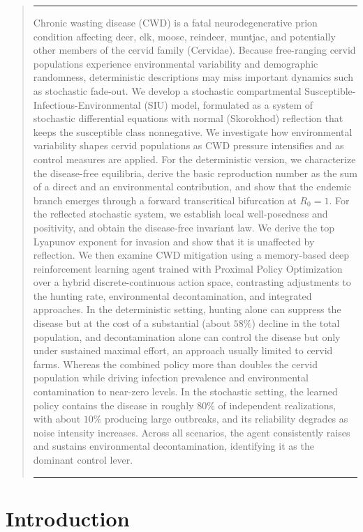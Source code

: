 \documentclass[12pt,a4paper,reqno]{amsart}
\theoremstyle{definition}
\theoremstyle{remark}
\theoremstyle{plain}
\renewenvironment{abstract}
{\begin{quote}
\noindent\rule{\linewidth}{.5pt}\par\vspace*{\dimexpr-1em+7pt\relax}{\scshape\abstractname.}}
{\par\vspace*{-1em}\noindent \rule{\linewidth}{.5pt}\vspace*{1.5em}
\end{quote}
}
\begin{document}
\begin{abstract}
Chronic wasting disease (CWD) is a fatal neurodegenerative prion condition affecting deer, elk, moose, reindeer, muntjac, and potentially other members of the cervid family (Cervidae). Because free-ranging cervid populations experience environmental variability and demographic randomness, deterministic descriptions may miss important dynamics such as stochastic fade-out. We develop a stochastic compartmental Susceptible-Infectious-Environmental (SIU) model, formulated as a system of stochastic differential equations with normal (Skorokhod) reflection that keeps the susceptible class nonnegative. We investigate how environmental variability shapes cervid populations as CWD pressure intensifies and as control measures are applied. For the deterministic version, we characterize the disease-free equilibria, derive the basic reproduction number as the sum of a direct and an environmental contribution, and show that the endemic branch emerges through a forward transcritical bifurcation at $R_0=1$. For the reflected stochastic system, we establish local well-posedness and positivity, and obtain the disease-free invariant law. We derive the top Lyapunov exponent for invasion and show that it is unaffected by reflection. We then examine CWD mitigation using a memory-based deep reinforcement learning agent trained with Proximal Policy Optimization over a hybrid discrete-continuous action space, contrasting adjustments to the hunting rate, environmental decontamination, and integrated approaches. In the deterministic setting, hunting alone can suppress the disease but at the cost of a substantial (about $58\%$) decline in the total population, and decontamination alone can control the disease but only under sustained maximal effort, an approach usually limited to cervid farms. Whereas the combined policy more than doubles the cervid population while driving infection prevalence and environmental contamination to near-zero levels. In the stochastic setting, the learned policy contains the disease in roughly $80\%$ of independent realizations, with about $10\%$ producing large outbreaks, and its reliability degrades as noise intensity increases. Across all scenarios, the agent consistently raises and sustains environmental decontamination, identifying it as the dominant control lever. 

\end{abstract}
\newpage
\section{Introduction}\label{Sec:Intro}
\end{document}

